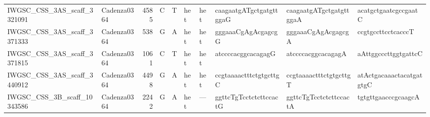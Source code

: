 \begin{tabular}{llrlllllll}
 IWGSC\_CSS\_3AS\_scaff\_3321091  & Cadenza0364 &       4585 & C         & T        & het            & het         & caagaatgATgctgatgttggaG   & caagaatgATgctgatgttggaA   & acatgctgaatcgccgaatC      \\
 IWGSC\_CSS\_3AS\_scaff\_3371333  & Cadenza0364 &        538 & G         & A        & het            & het         & gggaaaCgAgAcgagcgG        & gggaaaCgAgAcgagcgA        & ccgtgccttcctcacccT        \\
 IWGSC\_CSS\_3AS\_scaff\_3371815  & Cadenza0364 &       1061 & C         & T        & het            & het         & atccccacggcacagagG        & atccccacggcacagagA        & aAttggcccttggtgattcC      \\
 IWGSC\_CSS\_3AS\_scaff\_3440912  & Cadenza0364 &       4498 & G         & A        & het            & het         & ccgtaaaactttctgtgcttgC    & ccgtaaaactttctgtgcttgT    & atActgacaaactacatgatgtgC  \\
 IWGSC\_CSS\_3B\_scaff\_10343586  & Cadenza0364 &       2242 & G         & A        & het            & ---         & ggttcTgTcctctcttccactG    & ggttcTgTcctctcttccactA    & tgtgttgaacccgcaagcA       \\
\bottomrule
\end{tabular}
